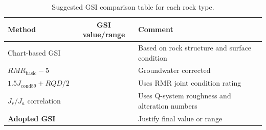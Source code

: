 \begin{table}[H]
\centering
\small
\begin{tabularx}{\textwidth}{l c Y}
\toprule
\textbf{Method} & \textbf{GSI value/range} & \textbf{Comment} \\
\midrule
Chart-based GSI & & Based on rock structure and surface condition \\
\(RMR_{\text{basic}}-5\) & & Groundwater corrected \\
\(1.5J_{\text{cond89}}+RQD/2\) & & Uses RMR joint condition rating \\
\(J_r/J_a\) correlation & & Uses Q-system roughness and alteration numbers \\
\midrule
\textbf{Adopted GSI} & & Justify final value or range \\
\bottomrule
\end{tabularx}
\caption{Suggested GSI comparison table for each rock type.}
\label{tab:gsi_template}
\end{table}

